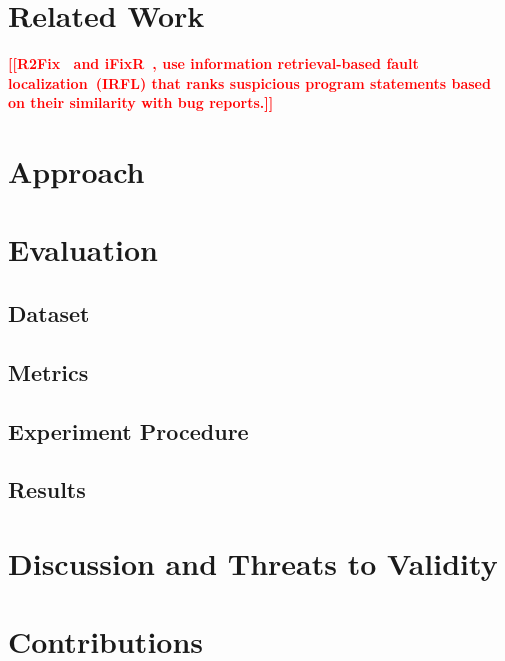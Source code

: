 \documentclass[conference]{IEEEtran}
\newcommand{\todo}[1]{\textcolor{red}{{\bfseries [[#1]]}}}
\begin{document}
\section{Related Work}
\label{sec:relatedwork}
\todo{R2Fix~\cite{Liu13} and iFixR~\cite{Koyuncu19}, use information retrieval-based fault localization~(IRFL)
that ranks suspicious program statements based on their similarity with bug reports.}

\section{Approach}
\label{sec:approach}

\section{Evaluation}
\label{sec:evaluation}

\subsection{Dataset}
\label{sec:dataset}

\subsection{Metrics}
\label{sec:metrics}

\subsection{Experiment Procedure}
\label{sec:experiment-procedure}

\subsection{Results}
\label{sec:results}

\section{Discussion and Threats to Validity}
\label{sec:dicussion}

\section{Contributions}
\label{sec:contributions}



\end{document}
